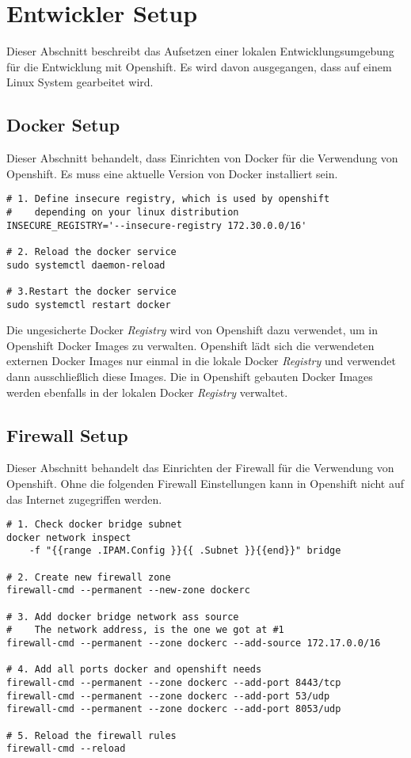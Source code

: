 \section{Entwickler Setup}
\label{sec:dev-setup}
Dieser Abschnitt beschreibt das Aufsetzen einer lokalen Entwicklungsumgebung für die Entwicklung mit Openshift. Es wird davon ausgegangen, dass auf einem Linux System gearbeitet wird.

\subsection{Docker Setup}
Dieser Abschnitt behandelt, dass Einrichten von Docker für die Verwendung von Openshift. Es muss eine aktuelle Version von Docker installiert sein.

\begin{verbatim}
# 1. Define insecure registry, which is used by openshift
#    depending on your linux distribution
INSECURE_REGISTRY='--insecure-registry 172.30.0.0/16'

# 2. Reload the docker service
sudo systemctl daemon-reload

# 3.Restart the docker service
sudo systemctl restart docker
\end{verbatim} 

Die ungesicherte Docker \emph{Registry} wird von Openshift dazu verwendet, um in Openshift Docker Images zu verwalten. Openshift lädt sich die verwendeten externen Docker Images nur einmal in die lokale Docker \emph{Registry} und verwendet dann ausschließlich diese Images. Die in Openshift gebauten Docker Images werden ebenfalls in der lokalen Docker \emph{Registry} verwaltet.
\newpage

\subsection{Firewall Setup}
Dieser Abschnitt behandelt das Einrichten der Firewall für die Verwendung von Openshift. Ohne die folgenden Firewall Einstellungen kann in Openshift nicht auf das Internet zugegriffen werden.

\begin{verbatim}
# 1. Check docker bridge subnet
docker network inspect 
	-f "{{range .IPAM.Config }}{{ .Subnet }}{{end}}" bridge

# 2. Create new firewall zone
firewall-cmd --permanent --new-zone dockerc

# 3. Add docker bridge network ass source
#    The network address, is the one we got at #1
firewall-cmd --permanent --zone dockerc --add-source 172.17.0.0/16

# 4. Add all ports docker and openshift needs
firewall-cmd --permanent --zone dockerc --add-port 8443/tcp
firewall-cmd --permanent --zone dockerc --add-port 53/udp
firewall-cmd --permanent --zone dockerc --add-port 8053/udp

# 5. Reload the firewall rules
firewall-cmd --reload
	
\end{verbatim}



